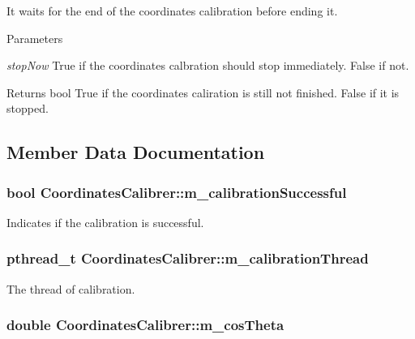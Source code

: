 It waits for the end of the coordinates calibration before ending it. 


\begin{DoxyParams}{Parameters}
\item[{\em stopNow}]True if the coordinates calbration should stop immediately. False if not. \end{DoxyParams}
\begin{DoxyReturn}{Returns}
bool True if the coordinates caliration is still not finished. False if it is stopped. 
\end{DoxyReturn}


\subsection{Member Data Documentation}
\hypertarget{classCoordinatesCalibrer_aade3d6c933ebb71c197061828ca6b951}{
\subsubsection[{m\_\-calibrationSuccessful}]{\setlength{\rightskip}{0pt plus 5cm}bool {\bf CoordinatesCalibrer::m\_\-calibrationSuccessful}}}
\label{classCoordinatesCalibrer_aade3d6c933ebb71c197061828ca6b951}
Indicates if the calibration is successful. \hypertarget{classCoordinatesCalibrer_aa2b792c4284dc94338c9acbd26ea2c3a}{
\subsubsection[{m\_\-calibrationThread}]{\setlength{\rightskip}{0pt plus 5cm}pthread\_\-t {\bf CoordinatesCalibrer::m\_\-calibrationThread}}}
\label{classCoordinatesCalibrer_aa2b792c4284dc94338c9acbd26ea2c3a}
The thread of calibration. \hypertarget{classCoordinatesCalibrer_a0fd71c87e90fc61802942e22c9584fb9}{
\subsubsection[{m\_\-cosTheta}]{\setlength{\rightskip}{0pt plus 5cm}double {\bf CoordinatesCalibrer::m\_\-cosTheta}}}
